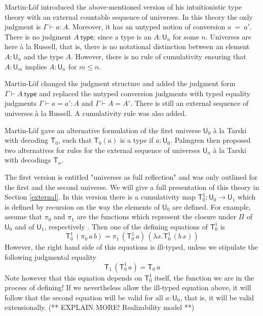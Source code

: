 \documentclass[11pt,a4paper]{article}
\newcommand{\conv}{=}
\def\UU{\mathsf{U}}
\newcommand{\type}{\mathsf{type}}
\newcommand{\T}{\mathsf{T}}
\begin{document}
Martin-Löf \cite{martinlof:predicative} introduced the above-mentioned version of his intuitionistic type theory with an external countable sequence of universes. In this theory the only judgment is  $\Gamma \vdash a : A$. Moreover, it has an untyped notion of conversion $a\ \conv\ a'$. There is no judgment $A\ \type$; since a type is an $A : \UU_n$ for some $n$. Universes are here \`a la Russell, that is, there is no notational distinction between an element $A : \UU_n$ and the type $A$. However, there is no rule of cumulativity ensuring that $A : \UU_m$ implies $A : \UU_n$ for $m \leq n$.

Martin-Löf \cite{martinlof:hannover} changed the judgment structure and added the judgment form $\Gamma \vdash A\ \type$
and replaced the untyped conversion judgments with typed equality judgments $\Gamma \vdash a = a' : A$ and $\Gamma \vdash A = A'$. There is still an external sequence of universes \`a la Russell. A cumulativity rule was also added.

Martin-Löf \cite{martinlof:padova} gave an alternative formulation of the first universe $\UU_0$ \`a la Tarski with decoding $\T_0$, such that $\T_0(a)$ is a type if $a : \UU_0$. 
Palmgren \cite{palmgren:venice} then proposed two alternatives for rules for the external sequence of universes $\UU_n$ \`a la Tarski with decodings $\T_n$. 

The first version is entitled "universes as full reflection" and was only outlined for the first and the second universe. We will give a full presentation of this theory in Section \ref{external}. In this version there is a cumulativity map $\T_0^1 : \UU_0 \to \UU_1$ which is defined by recursion on the way the elements of $\UU_0$ are defined. For example, assume that $\pi_0$ and $\pi_1$ are the functions which represent the closure under $\Pi$ of $\UU_0$ and of $\UU_1$, respectively . Then one of the defining equations of $\T_0^1$ is
$$
\T_0^1\, (\pi_0\,a\, b) = \pi_1\,(\T_0^1\,a)\,(\lambda x.\T_0^1\,(b\,x))
$$
However, the right hand side of this equations is ill-typed, unless we stipulate the following judgmental equality
$$
\T_1\, (\T_0^1\, a) = \T_0\, a
$$
Note however that this equation depends on $\T_0^1$ itself, the function we are in the process of defining! If we nevertheless allow the ill-typed equation above, it will follow that the second equation will be valid for all $a : \UU_0$, that is, it will be valid extensionally. (** EXPLAIN MORE! Realizability model **) 
\end{document}
